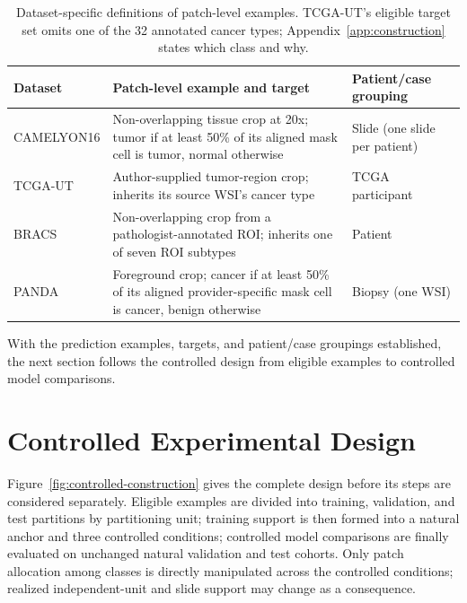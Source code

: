 \documentclass[11pt]{article}
\begin{document}
\begin{table}[ht]
  \centering
  \scriptsize
  \begin{tabularx}{\linewidth}{@{}l>{\raggedright\arraybackslash}X>{\raggedright\arraybackslash}X@{}}
    \toprule
    Dataset & Patch-level example and target & Patient/case grouping \\
    \midrule
    CAMELYON16 & Non-overlapping tissue crop at \num{20}x; tumor if at least \num{50}\% of its aligned mask cell is tumor, normal otherwise & Slide (one slide per patient) \\
    TCGA-UT & Author-supplied tumor-region crop; inherits its source WSI's cancer type & TCGA participant \\
    BRACS & Non-overlapping crop from a pathologist-annotated ROI; inherits one of seven ROI subtypes & Patient \\
    PANDA & Foreground crop; cancer if at least \num{50}\% of its aligned provider-specific mask cell is cancer, benign otherwise & Biopsy (one WSI) \\
    \bottomrule
  \end{tabularx}
  \caption{Dataset-specific definitions of patch-level examples. TCGA-UT's eligible target set omits one of the 32 annotated cancer types; Appendix~\ref{app:construction} states which class and why.}
  \label{tab:datasets}
\end{table}

With the prediction examples, targets, and patient/case groupings established, the next section follows the controlled design from eligible examples to controlled model comparisons.

\section{Controlled Experimental Design}
\label{sec:design}
\label{sec:construction}
Figure~\ref{fig:controlled-construction} gives the complete design before its steps are considered separately. Eligible examples are divided into training, validation, and test partitions by partitioning unit; training support is then formed into a natural anchor and three controlled conditions; controlled model comparisons are finally evaluated on unchanged natural validation and test cohorts. Only patch allocation among classes is directly manipulated across the controlled conditions; realized independent-unit and slide support may change as a consequence.
\end{document}
